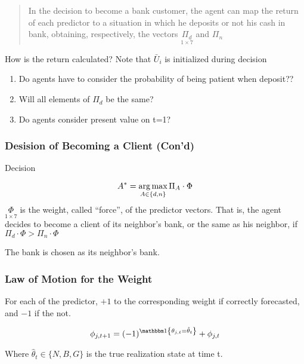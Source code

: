 \begin{frame}

    \begin{quote}
        In the decision to become a bank customer, the agent can map the return of each predictor to a situation
        in which he deposits or not his cash in bank, obtaining, respectively, the vectors $\underset{1\times 7}{\Pi_d}$ and $\Pi_n$
    \end{quote}

    \pause

    \begin{alertblock}{How is the return calculated?}
        Note that $\bar{U}_i$ is initialized during decision
        \begin{enumerate}
            \item Do agents have to consider the probability of being patient when deposit??
            \item Will all elements of $\Pi_d$ be the same?
            \item Do agents consider present value on t=1?
        \end{enumerate}
    \end{alertblock}
\end{frame}

\begin{frame}
    \frametitle{Desision of Becoming a Client (Con'd)}
    Decision 

    \begin{equation*}
        A^* = \operatorname*{arg\,max}_{A\in\{d, n\}}  \Pi_A \cdot \Phi
    \end{equation*}
    $\underset{1 \times 7}{\Phi}$ is the weight, called ``force'', of the predictor vectors.
    \vfill
    That is, the agent decides to become a client of its neighbor's bank, or the same as his neighbor, if $\Pi_d \cdot \Phi > \Pi_n \cdot \Phi$

    \vfill
    
    The bank is chosen as its neighbor's bank.
\end{frame}

\begin{frame}
    \frametitle{Law of Motion for the Weight}

    For each of the predictor, $+1$ to the corresponding weight if correctly forecasted, and $-1$ if the not.

    \begin{equation*}
        \phi_{j, t+1} = (-1)^{\I{\theta_{j,t}=\hat{\theta}_t}} + \phi_{j, t}
    \end{equation*}
    
    Where $\hat{\theta}_t \in \{N,B,G\}$ is the true realization state at time t. 

\end{frame}

